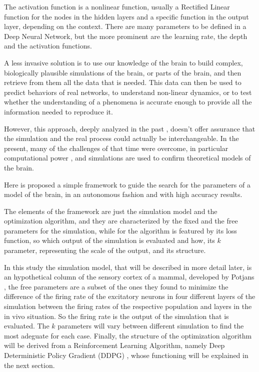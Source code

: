 The activation function is a nonlinear function, usually a Rectified Linear function for the nodes in the hidden layers and a specific function in the output layer, depending on the context. 
There are many parameters to be defined in a Deep Neural Network, but the more prominent are the learning rate, the depth and the activation functions.


A less invasive solution is to use our knowledge of the brain to build complex, biologically plausible simulations of the brain, or parts of the brain, and then retrieve from them all the data that is needed. This data can then be used to predict behaviors of real networks, to understand non-linear dynamics, or to test whether the understanding of a phenomena is accurate enough to provide all the information needed to reproduce it.

However, this approach, deeply analyzed in the past \cite{smolensky}, doesn't offer assurance that the simulation and the real process could actually be interchangeable. In the present, many of the challenges of that time were overcome, in particular computational power \cite{bluegene}, and simulations are used to confirm theoretical models of the brain.


Here is proposed a simple framework to guide the search for the parameters of a model of the brain, in an autonomous fashion and with high accuracy results. 

The elements of the framework are just the simulation model and the optimization algorithm, and they are characterized by the fixed and the free parameters for the simulation, while for the algorithm is featured by its loss function, so which output of the simulation is evaluated and how, its $k$ parameter, representing the scale of the output, and its structure.

In this study the simulation model, that will be described in more detail later, is an hypothetical column of the sensory cortex of a mammal, developed by Potjans \cite{potjans}, the free parameters are a subset of the ones they found to minimize the difference of the firing rate of the excitatory neurons in four different layers of the simulation between the firing rates of the respective population and layers in the in vivo situation. So the firing rate is the output of the simulation that is evaluated. The $k$ parameters will vary between different simulation to find the most adeguate for each case. Finally, the structure of the optimization algorithm will be derived from a Reinforcement Learning Algorithm, namely Deep Deterministic Policy Gradient (DDPG) \cite{lillicrap}, whose functioning will be explained in the next section.


